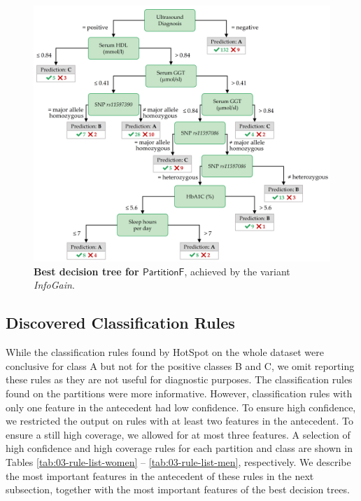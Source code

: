 \documentclass[
  oneside]{book}
\begin{document}
\begin{figure}

{\centering \includegraphics[width=1\linewidth]{figures/03-tree-men} 

}

\caption{\textbf{Best decision tree for \(\mathsf{PartitionF}\)}, achieved by the variant \emph{InfoGain}.}\label{fig:03-tree-men}
\end{figure}

\hypertarget{discovered-classification-rules}{%
\subsection{Discovered Classification Rules}\label{discovered-classification-rules}}

While the classification rules found by HotSpot on the whole dataset were conclusive for class A but not for the positive classes B and C, we omit reporting these rules as they are not useful for diagnostic purposes.
The classification rules found on the partitions were more informative.
However, classification rules with only one feature in the antecedent had low confidence.
To ensure high confidence, we restricted the output on rules with at least two features in the antecedent.
To ensure a still high coverage, we allowed for at most three features.
A selection of high confidence and high coverage rules for each partition and class are shown in Tables \ref{tab:03-rule-list-women} -- \ref{tab:03-rule-list-men}, respectively.
We describe the most important features in the antecedent of these rules in the next subsection, together with the most important features of the best decision trees.
\end{document}
